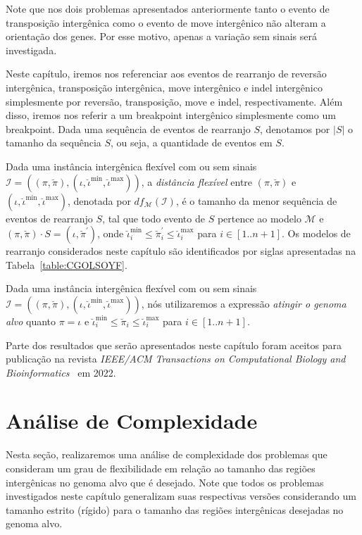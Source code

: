 Note que nos dois problemas apresentados anteriormente tanto o evento de transposição intergênica como o evento de move intergênico não alteram a orientação dos genes. Por esse motivo, apenas a variação sem sinais será investigada.

Neste capítulo, iremos nos referenciar aos eventos de rearranjo de reversão intergênica, transposição intergênica, move intergênico e indel intergênico simplesmente por reversão, transposição, move e indel, respectivamente. Além disso, iremos nos referir a um breakpoint intergênico simplesmente como um breakpoint. Dada uma sequência de eventos de rearranjo $S$, denotamos por $|S|$ o tamanho da sequência $S$, ou seja, a quantidade de eventos em $S$.

Dada uma instância intergênica flexível com ou sem sinais $\mathcal{I} = ((\pi,\breve\pi),(\iota,\breve\iota^{\min},\breve\iota^{\max}))$, a \emph{distância flexível} entre $(\pi,\breve\pi)$ e $(\iota,\breve\iota^{\min},\breve\iota^{\max})$, denotada por $df_{\mathcal{M}}(\mathcal{I})$, é o tamanho da menor sequência de eventos de rearranjo $S$, tal que todo evento de $S$ pertence ao modelo $\mathcal{M}$ e $(\pi,\breve\pi) \cdot S = (\iota,\breve\pi^{\prime})$, onde $\breve\iota^{\min}_i \le \breve\pi^{\prime}_i \le \breve\iota^{\max}_i$ para $i \in [1..n+1]$. Os modelos de rearranjo considerados neste capítulo são identificados por siglas apresentadas na Tabela~\ref{table:CGOLSOYF}.



Dada uma instância intergênica flexível com ou sem sinais $\mathcal{I} = ((\pi,\breve\pi),(\iota,\breve\iota^{\min},\breve\iota^{\max}))$, nós utilizaremos a expressão \emph{atingir o genoma alvo} quanto $\pi = \iota$ e $\breve\iota^{\min}_i \le \breve\pi_i \le \breve\iota^{\max}_i$ para $i \in [1..n+1]$.

Parte dos resultados que serão apresentados neste capítulo foram aceitos para publicação na revista \emph{IEEE/ACM Transactions on Computational Biology and Bioinformatics}~\cite{2022a-brito-etal} em 2022.

\section{Análise de Complexidade}

Nesta seção, realizaremos uma análise de complexidade dos problemas que consideram um grau de flexibilidade em relação ao tamanho das regiões intergênicas no genoma alvo que é desejado. Note que todos os problemas investigados neste capítulo generalizam suas respectivas versões considerando um tamanho estrito (rígido) para o tamanho das regiões intergênicas desejadas no genoma alvo.

